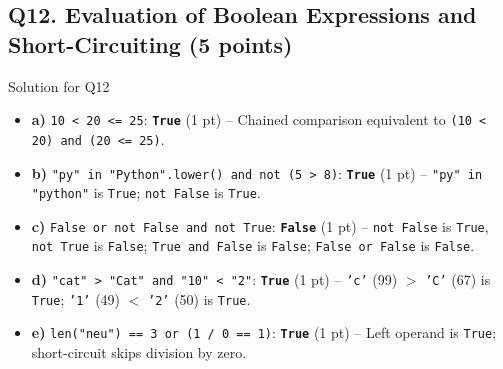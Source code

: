 \documentclass[11pt,a4paper]{article}
\begin{document}
\subsection*{Q12. Evaluation of Boolean Expressions and Short-Circuiting (5 points)}
\begin{solbox}{Solution for Q12}
\begin{itemize}[leftmargin=2em]
  \item \textbf{a)} \texttt{10 < 20 <= 25}: \textbf{\texttt{True}} (1 pt) -- Chained comparison equivalent to \texttt{(10 < 20) and (20 <= 25)}.
  \item \textbf{b)} \texttt{"py" in "Python".lower() and not (5 > 8)}: \textbf{\texttt{True}} (1 pt) -- \texttt{"py" in "python"} is \texttt{True}; \texttt{not False} is \texttt{True}.
  \item \textbf{c)} \texttt{False or not False and not True}: \textbf{\texttt{False}} (1 pt) -- \texttt{not False} is \texttt{True}, \texttt{not True} is \texttt{False}; \texttt{True and False} is \texttt{False}; \texttt{False or False} is \texttt{False}.
  \item \textbf{d)} \texttt{"cat" > "Cat" and "10" < "2"}: \textbf{\texttt{True}} (1 pt) -- \texttt{'c'} (99) $>$ \texttt{'C'} (67) is \texttt{True}; \texttt{'1'} (49) $<$ \texttt{'2'} (50) is \texttt{True}.
  \item \textbf{e)} \texttt{len("neu") == 3 or (1 / 0 == 1)}: \textbf{\texttt{True}} (1 pt) -- Left operand is \texttt{True}; short-circuit skips division by zero.
\end{itemize}
\end{solbox}

\newpage
\end{document}
